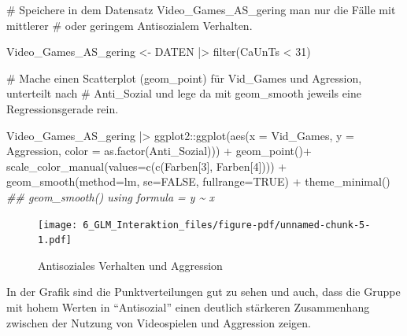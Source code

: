 \documentclass[
  10pt,
  letterpaper,
  a4paper, twoside]{scrreprt}
\newenvironment{Shaded}{\begin{snugshade}}{\end{snugshade}}
\newcommand{\AttributeTok}[1]{\textcolor[rgb]{0.40,0.45,0.13}{#1}}
\newcommand{\CommentTok}[1]{\textcolor[rgb]{0.37,0.37,0.37}{#1}}
\newcommand{\ConstantTok}[1]{\textcolor[rgb]{0.56,0.35,0.01}{#1}}
\newcommand{\DecValTok}[1]{\textcolor[rgb]{0.68,0.00,0.00}{#1}}
\newcommand{\DocumentationTok}[1]{\textcolor[rgb]{0.37,0.37,0.37}{\textit{#1}}}
\newcommand{\FunctionTok}[1]{\textcolor[rgb]{0.28,0.35,0.67}{#1}}
\newcommand{\NormalTok}[1]{\textcolor[rgb]{0.00,0.23,0.31}{#1}}
\newcommand{\OtherTok}[1]{\textcolor[rgb]{0.00,0.23,0.31}{#1}}
\newcommand{\SpecialCharTok}[1]{\textcolor[rgb]{0.37,0.37,0.37}{#1}}
\begin{document}
\begin{Shaded}
\begin{Highlighting}[]
\CommentTok{\# Speichere in dem Datensatz Video\_Games\_AS\_gering man nur die Fälle mit mittlerer }
\CommentTok{\# oder geringem Antisozialem Verhalten.}

\NormalTok{Video\_Games\_AS\_gering }\OtherTok{\textless{}{-}}\NormalTok{ DATEN  }\SpecialCharTok{|\textgreater{}}
  \FunctionTok{filter}\NormalTok{(CaUnTs }\SpecialCharTok{\textless{}} \DecValTok{31}\NormalTok{)}

\CommentTok{\# Mache einen Scatterplot (geom\_point) für Vid\_Games und Agression, unterteilt nach }
\CommentTok{\# Anti\_Sozial und lege da mit geom\_smooth jeweils eine Regressionsgerade rein.}

\NormalTok{Video\_Games\_AS\_gering  }\SpecialCharTok{|\textgreater{}} 
\NormalTok{  ggplot2}\SpecialCharTok{::}\FunctionTok{ggplot}\NormalTok{(}\FunctionTok{aes}\NormalTok{(}\AttributeTok{x =}\NormalTok{ Vid\_Games, }\AttributeTok{y =}\NormalTok{ Aggression, }\AttributeTok{color =} \FunctionTok{as.factor}\NormalTok{(Anti\_Sozial))) }\SpecialCharTok{+}
  \FunctionTok{geom\_point}\NormalTok{()}\SpecialCharTok{+} 
  \FunctionTok{scale\_color\_manual}\NormalTok{(}\AttributeTok{values=}\FunctionTok{c}\NormalTok{(}\FunctionTok{c}\NormalTok{(Farben[}\DecValTok{3}\NormalTok{], Farben[}\DecValTok{4}\NormalTok{]))) }\SpecialCharTok{+} 
  \FunctionTok{geom\_smooth}\NormalTok{(}\AttributeTok{method=}\NormalTok{lm, }\AttributeTok{se=}\ConstantTok{FALSE}\NormalTok{, }\AttributeTok{fullrange=}\ConstantTok{TRUE}\NormalTok{) }\SpecialCharTok{+} 
  \FunctionTok{theme\_minimal}\NormalTok{()}
\DocumentationTok{\#\# \textasciigrave{}geom\_smooth()\textasciigrave{} using formula = \textquotesingle{}y \textasciitilde{} x\textquotesingle{}}
\end{Highlighting}
\end{Shaded}

\begin{figure}[H]

{\centering \texttt{[image: 6\_GLM\_Interaktion\_files/figure-pdf/unnamed-chunk-5-1.pdf]}

}

\caption{Antisoziales Verhalten und Aggression}

\end{figure}%

In der Grafik sind die Punktverteilungen gut zu sehen und auch, dass die
Gruppe mit hohem Werten in \enquote{Antisozial} einen deutlich stärkeren
Zusammenhang zwischen der Nutzung von Videospielen und Aggression
zeigen.
\end{document}
